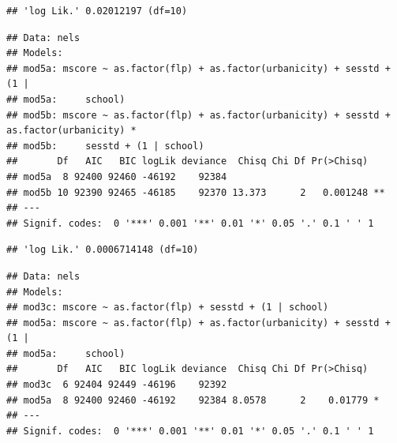 \documentclass[ignorenonframetext,]{beamer}
\begin{document}
\begin{frame}[fragile]{}

\begin{verbatim}
## 'log Lik.' 0.02012197 (df=10)
\end{verbatim}

\begin{verbatim}
## Data: nels
## Models:
## mod5a: mscore ~ as.factor(flp) + as.factor(urbanicity) + sesstd + (1 | 
## mod5a:     school)
## mod5b: mscore ~ as.factor(flp) + as.factor(urbanicity) + sesstd + as.factor(urbanicity) * 
## mod5b:     sesstd + (1 | school)
##       Df   AIC   BIC logLik deviance  Chisq Chi Df Pr(>Chisq)   
## mod5a  8 92400 92460 -46192    92384                            
## mod5b 10 92390 92465 -46185    92370 13.373      2   0.001248 **
## ---
## Signif. codes:  0 '***' 0.001 '**' 0.01 '*' 0.05 '.' 0.1 ' ' 1
\end{verbatim}

\begin{verbatim}
## 'log Lik.' 0.0006714148 (df=10)
\end{verbatim}

\begin{verbatim}
## Data: nels
## Models:
## mod3c: mscore ~ as.factor(flp) + sesstd + (1 | school)
## mod5a: mscore ~ as.factor(flp) + as.factor(urbanicity) + sesstd + (1 | 
## mod5a:     school)
##       Df   AIC   BIC logLik deviance  Chisq Chi Df Pr(>Chisq)  
## mod3c  6 92404 92449 -46196    92392                           
## mod5a  8 92400 92460 -46192    92384 8.0578      2    0.01779 *
## ---
## Signif. codes:  0 '***' 0.001 '**' 0.01 '*' 0.05 '.' 0.1 ' ' 1
\end{verbatim}


\end{frame}
\end{document}
